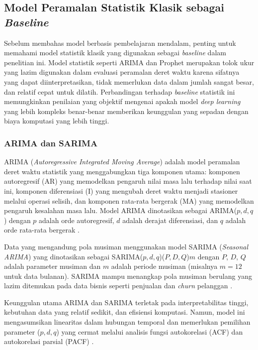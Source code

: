 \subsection{Model Peramalan Statistik Klasik sebagai \textit{Baseline}}
\label{subsec:model-statistik}

Sebelum membahas model berbasis pembelajaran mendalam, penting untuk memahami model statistik klasik yang digunakan sebagai \textit{baseline} dalam penelitian ini. Model statistik seperti ARIMA dan Prophet merupakan tolok ukur yang lazim digunakan dalam evaluasi peramalan deret waktu karena sifatnya yang dapat diinterpretasikan, tidak memerlukan data dalam jumlah sangat besar, dan relatif cepat untuk dilatih. Perbandingan terhadap \textit{baseline} statistik ini memungkinkan penilaian yang objektif mengenai apakah model \textit{deep learning} yang lebih kompleks benar-benar memberikan keunggulan yang sepadan dengan biaya komputasi yang lebih tinggi.

\subsubsection{ARIMA dan SARIMA}

ARIMA (\textit{Autoregressive Integrated Moving Average}) adalah model peramalan deret waktu statistik yang menggabungkan tiga komponen utama: komponen autoregresif (AR) yang memodelkan pengaruh nilai masa lalu terhadap nilai saat ini, komponen diferensiasi (I) yang mengubah deret waktu menjadi stasioner melalui operasi selisih, dan komponen rata-rata bergerak (MA) yang memodelkan pengaruh kesalahan masa lalu. Model ARIMA dinotasikan sebagai ARIMA(\(p, d, q\))\label{sym:pdq} dengan \(p\) adalah orde autoregresif, \(d\) adalah derajat diferensiasi, dan \(q\) adalah orde rata-rata bergerak \autocite{Petropoulos2022ForecastingPractice,Spiliotis2020ForecastingBenchmarks}.

Data yang mengandung pola musiman menggunakan model SARIMA (\textit{Seasonal ARIMA}) yang dinotasikan sebagai SARIMA(\(p, d, q\))(\(P, D, Q\))\label{sym:PDQ}\(m\)\label{sym:m} dengan \(P\), \(D\), \(Q\) adalah parameter musiman dan \(m\) adalah periode musiman (misalnya \(m = 12\) untuk data bulanan). SARIMA mampu menangkap pola musiman berulang yang lazim ditemukan pada data bisnis seperti penjualan dan \textit{churn} pelanggan \autocite{Petropoulos2022ForecastingPractice}.

Keunggulan utama ARIMA dan SARIMA terletak pada interpretabilitas tinggi, kebutuhan data yang relatif sedikit, dan efisiensi komputasi. Namun, model ini mengasumsikan linearitas dalam hubungan temporal dan memerlukan pemilihan parameter (\(p, d, q\)) yang cermat melalui analisis fungsi autokorelasi (ACF) dan autokorelasi parsial (PACF) \autocite{Petropoulos2022ForecastingPractice,Spiliotis2020ForecastingBenchmarks}.

